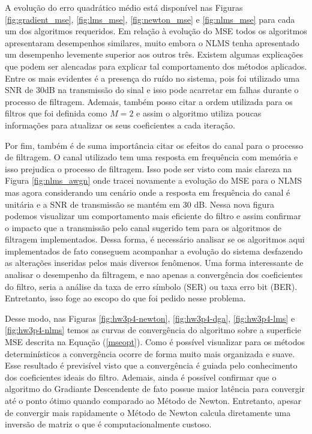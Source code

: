 \begin{enumerate}
        A evolução do erro quadrático médio está disponível nas Figuras \ref{fig:gradient_mse}, \ref{fig:lms_mse}, \ref{fig:newton_mse} e \ref{fig:nlms_mse} para cada um dos algoritmos requeridos.
        Em relação à evolução do MSE todos os algoritmos apresentaram desempenhos similares, muito embora o NLMS tenha apresentado um desempenho levemente superior aos outros três. Existem algumas explicações que podem
        ser alencadas para explicar tal comportamento dos métodos aplicados. Entre os mais evidentes é a presença do ruído no sistema, pois foi utilizado uma SNR de 30dB na transmissão do sinal e isso pode acarretar em 
        falhas durante o processo de filtragem. Ademais, também posso citar a ordem utilizada para os filtros que foi definida como $M = 2$ e assim o algoritmo utiliza poucas informações para atualizar os seus coeficientes a cada iteração. 
        
        Por fim, também é de suma importância citar os efeitos do canal para o processo de filtragem. O canal utilizado tem uma resposta em frequência com memória e isso prejudica o processo de filtragem. Isso pode ser visto com mais clareza
        na Figura \ref{fig:nlms_awgn} onde tracei novamente a evolução do MSE para o NLMS mas agora considerando um cenário onde a resposta em frequência do canal é unitária e a SNR de transmissão se mantém em 30 dB. Nessa nova figura 
        podemos visualizar um comportamento mais eficiente do filtro e assim confirmar o impacto que a transmissão pelo canal sugerido tem para os algoritmos de filtragem implementados. Dessa forma, é necessário analisar se os algoritmos aqui 
        implementados de fato conseguem acompanhar a evolução do sistema desfazendo as alterações inseridas pelos mais diversos fenômenos. Uma forma interessante de analisar o desempenho da filtragem, e nao apenas a convergência dos coeficientes 
        do filtro, seria a análise da taxa de erro símbolo (SER) ou taxa erro bit (BER). Entretanto, isso foge ao escopo do que foi pedido nesse problema.
        
        
        Desse modo, nas Figuras \ref{fig:hw3p4-newton}, \ref{fig:hw3p4-dga}, \ref{fig:hw3p4-lms} e \ref{fig:hw3p4-nlms} temos as curvas de convergência do algoritmo sobre a superficie MSE descrita na Equação (\ref{mseopt}). 
        Como é possível visualizar para os métodos determinísticos a convergência ocorre de forma muito mais organizada e suave. Esse resultado é previsível visto que a convergência é guiada 
        pelo conhecimento dos coeficientes ideais do filtro. Ademais, ainda é possível confirmar que o algoritmo do Gradiante Descendente de fato possue maior latência para convergir até o ponto 
        ótimo quando comparado ao Método de Newton. Entretanto, apesar de convergir mais rapidamente o Método de Newton calcula diretamente uma inversão de matriz o que é computacionalmente custoso.
        

\end{enumerate}
